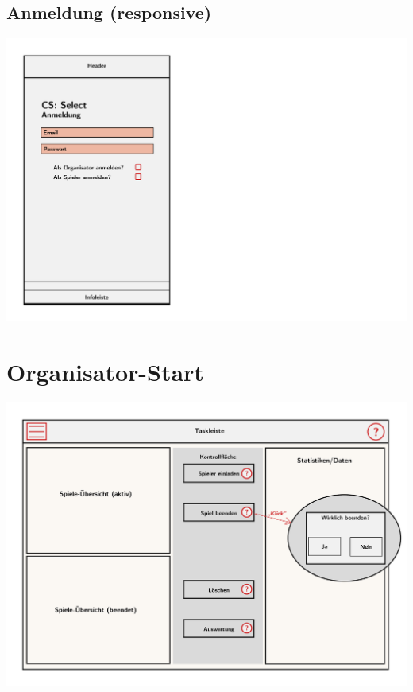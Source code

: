 \documentclass[a4paper]{scrreprt}
\begin{document}
    \subsection{Anmeldung (responsive)}
    \centering
    \includegraphics[width=\textwidth]{../pictures/Anmeldung_responsive.jpg}

    \section{Organisator-Start}
    \centering
    \includegraphics[width=\textwidth]{../pictures/2_Organisator.jpg}
\end{document}
